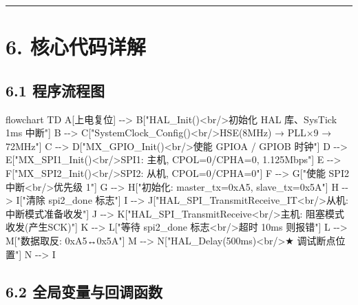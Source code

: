 \documentclass[
  chinese,
  UTF8,
  oneside,
  openany]{ctexbook}
\newenvironment{Shaded}{}{}
\newcommand{\NormalTok}[1]{#1}
\begin{document}
\begin{center}\rule{0.5\linewidth}{0.5pt}\end{center}

\section{6. 核心代码详解}\label{ux6838ux5fc3ux4ee3ux7801ux8be6ux89e3-3}

\subsection{6.1 程序流程图}\label{ux7a0bux5e8fux6d41ux7a0bux56fe-3}

\begin{Shaded}
\begin{Highlighting}[]
\NormalTok{flowchart TD}
\NormalTok{    A[上电复位] {-}{-}\textgreater{} B["HAL\_Init()\textless{}br/\textgreater{}初始化 HAL 库、SysTick 1ms 中断"]}
\NormalTok{    B {-}{-}\textgreater{} C["SystemClock\_Config()\textless{}br/\textgreater{}HSE(8MHz) → PLL×9 → 72MHz"]}
\NormalTok{    C {-}{-}\textgreater{} D["MX\_GPIO\_Init()\textless{}br/\textgreater{}使能 GPIOA / GPIOB 时钟"]}
\NormalTok{    D {-}{-}\textgreater{} E["MX\_SPI1\_Init()\textless{}br/\textgreater{}SPI1: 主机, CPOL=0/CPHA=0, 1.125Mbps"]}
\NormalTok{    E {-}{-}\textgreater{} F["MX\_SPI2\_Init()\textless{}br/\textgreater{}SPI2: 从机, CPOL=0/CPHA=0"]}
\NormalTok{    F {-}{-}\textgreater{} G["使能 SPI2 中断\textless{}br/\textgreater{}优先级 1"]}
\NormalTok{    G {-}{-}\textgreater{} H["初始化: master\_tx=0xA5, slave\_tx=0x5A"]}
\NormalTok{    H {-}{-}\textgreater{} I["清除 spi2\_done 标志"]}
\NormalTok{    I {-}{-}\textgreater{} J["HAL\_SPI\_TransmitReceive\_IT\textless{}br/\textgreater{}从机: 中断模式准备收发"]}
\NormalTok{    J {-}{-}\textgreater{} K["HAL\_SPI\_TransmitReceive\textless{}br/\textgreater{}主机: 阻塞模式收发(产生SCK)"]}
\NormalTok{    K {-}{-}\textgreater{} L["等待 spi2\_done 标志\textless{}br/\textgreater{}超时 10ms 则报错"]}
\NormalTok{    L {-}{-}\textgreater{} M["数据取反: 0xA5↔0x5A"]}
\NormalTok{    M {-}{-}\textgreater{} N["HAL\_Delay(500ms)\textless{}br/\textgreater{}★ 调试断点位置"]}
\NormalTok{    N {-}{-}\textgreater{} I}
\end{Highlighting}
\end{Shaded}

\subsection{6.2
全局变量与回调函数}\label{ux5168ux5c40ux53d8ux91cfux4e0eux56deux8c03ux51fdux6570}
\end{document}
